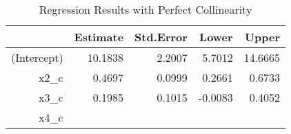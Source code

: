 \begin{table}[ht]
\centering
\caption{Regression Results with Perfect Collinearity} 
\label{tab:regression_perfect_collinearity}
\begin{tabular}{rrrrr}
  \hline
 & Estimate & Std.Error & Lower & Upper \\ 
  \hline
(Intercept) & 10.1838 & 2.2007 & 5.7012 & 14.6665 \\ 
  x2\_c & 0.4697 & 0.0999 & 0.2661 & 0.6733 \\ 
  x3\_c & 0.1985 & 0.1015 & -0.0083 & 0.4052 \\ 
  x4\_c &  &  &  &  \\ 
   \hline
\end{tabular}
\end{table}
